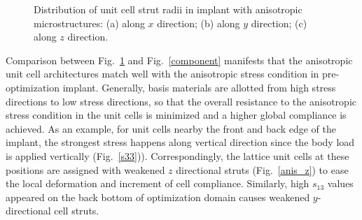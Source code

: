 \documentclass[12pt]{extbook}
\begin{document}
\begin{figure}[htbp]
\centering
{}
\caption{Distribution of unit cell strut radii in implant with anisotropic microstructures: (a) along $x$ direction; (b) along $y$ direction; (c) along $z$ direction.}
\label{anis}
\end{figure}

Comparison between Fig.~\ref{anis} and Fig.~\ref{component} manifests that the anisotropic unit cell architectures match well with the anisotropic stress condition in pre-optimization implant. Generally, basis materials are allotted from high stress directions to low stress directions, so that the overall resistance to the anisotropic stress condition in the unit cells is minimized and a higher global compliance is achieved. As an example, for unit cells nearby the front and back edge of the implant, the strongest stress happens along vertical direction since the body load is applied vertically (Fig.~\ref{s33})). Correspondingly, the lattice unit cells at these positions are assigned with weakened $z$ directional struts (Fig.~\ref{anis_z}) to ease the local deformation and increment of cell compliance. Similarly, high $s_{13}$ values appeared on the back bottom of optimization domain causes weakened $y$-directional cell struts.\\
\end{document}
